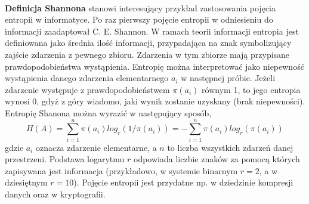 \documentclass[12pt,a4paper,openright]{report} %
\begin{document}
\\
\textbf{Definicja Shannona} stanowi interesujący przykład zastosowania pojęcia entropii w informatyce. Po raz pierwszy pojęcie entropii w odniesieniu do informacji zaadaptował C. E. Shannon.
W ramach teorii informacji entropia jest definiowana jako średnia ilość informacji, przypadająca na znak symbolizujący zajście zdarzenia z pewnego zbioru. Zdarzenia w tym zbiorze mają przypisane prawdopodobieństwa wystąpienia.
Entropię można interpretować jako niepewność wystąpienia danego zdarzenia elementarnego $a_i$ w następnej próbie. Jeżeli zdarzenie występuje z prawdopodobieństwem $\pi(a_i)$ równym 1, to jego entropia wynosi 0, gdyż z góry wiadomo, jaki wynik zostanie uzyskany (brak niepewności). Entropię Shanona można wyrazić w następujący sposób,
\begin{equation}
H(A)=\sum \limits_{i=1}^{n} \pi(a_i) log_r(1/\pi(a_i))=-\sum \limits_{i=1}^{n} \pi(a_i)log_r(\pi(a_i))
\end{equation}
gdzie $a_i$ oznacza zdarzenie elementarne, a $n$ to liczba wszystkich zdarzeń danej przestrzeni. Podstawa logarytmu $r$ odpowiada liczbie znaków za pomocą których zapisywana jest informacja (przykładowo, w systemie binarnym $r=2$, a w dziesiętnym $r=10$).
Pojęcie entropii jest przydatne np. w dziedzinie kompresji danych oraz w kryptografii.
\end{document}
